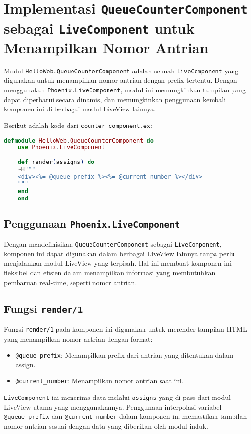\section{Implementasi \texttt{QueueCounterComponent} sebagai \texttt{LiveComponent} untuk Menampilkan Nomor Antrian}

Modul \texttt{HelloWeb.QueueCounterComponent} adalah sebuah \texttt{LiveComponent} yang digunakan untuk menampilkan nomor antrian dengan prefix tertentu. Dengan menggunakan \texttt{Phoenix.LiveComponent}, modul ini memungkinkan tampilan yang dapat diperbarui secara dinamis, dan memungkinkan penggunaan kembali komponen ini di berbagai modul LiveView lainnya.

Berikut adalah kode dari \texttt{counter\_component.ex}:

\begin{lstlisting}[language=Elixir]
	defmodule HelloWeb.QueueCounterComponent do
	use Phoenix.LiveComponent
	
	def render(assigns) do
	~H"""
	<div><%= @queue_prefix %><%= @current_number %></div>
	"""
	end
	end
\end{lstlisting}

\subsection{Penggunaan \texttt{Phoenix.LiveComponent}}
Dengan mendefinisikan \texttt{QueueCounterComponent} sebagai \texttt{LiveComponent}, komponen ini dapat digunakan dalam berbagai LiveView lainnya tanpa perlu menjalankan modul LiveView yang terpisah. Hal ini membuat komponen ini fleksibel dan efisien dalam menampilkan informasi yang membutuhkan pembaruan real-time, seperti nomor antrian.

\subsection{Fungsi \texttt{render/1}}
Fungsi \texttt{render/1} pada komponen ini digunakan untuk merender tampilan HTML yang menampilkan nomor antrian dengan format:
\begin{itemize}
	\item \texttt{@queue\_prefix}: Menampilkan prefix dari antrian yang ditentukan dalam assign.
	\item \texttt{@current\_number}: Menampilkan nomor antrian saat ini.
\end{itemize}

\texttt{LiveComponent} ini menerima data melalui \texttt{assigns} yang di-pass dari modul LiveView utama yang menggunakannya. Penggunaan interpolasi variabel \texttt{@queue\_prefix} dan \texttt{@current\_number} dalam komponen ini memastikan tampilan nomor antrian sesuai dengan data yang diberikan oleh modul induk.

